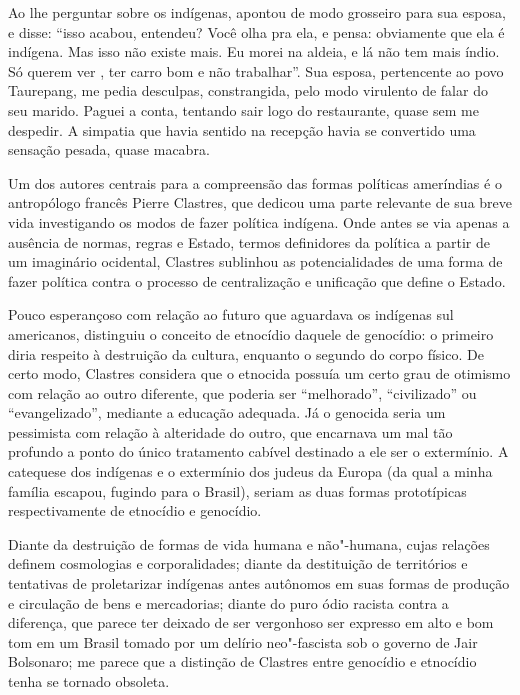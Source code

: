 Ao lhe perguntar sobre os indígenas, apontou de modo grosseiro para sua
esposa, e disse: ``isso acabou, entendeu? Você olha pra ela, e pensa:
obviamente que ela é indígena. Mas isso não existe mais. Eu morei na
aldeia, e lá não tem mais índio. Só querem ver , ter carro bom e não
trabalhar''. Sua esposa, pertencente ao povo Taurepang, me pedia
desculpas, constrangida, pelo modo virulento de falar do seu marido.
Paguei a conta, tentando sair logo do restaurante, quase sem me
despedir. A simpatia que havia sentido na recepção havia se convertido
uma sensação pesada, quase macabra.

\asterisc

Um dos autores centrais para a compreensão das formas políticas
ameríndias é o antropólogo francês Pierre Clastres, que dedicou uma
parte relevante de sua breve vida investigando os modos de fazer
política indígena. Onde antes se via apenas a ausência de normas, regras
e Estado, termos definidores da política a partir de um imaginário
ocidental, Clastres sublinhou as potencialidades de uma forma de fazer
política contra o processo de centralização e unificação que define o
Estado.

Pouco esperançoso com relação ao futuro que aguardava os indígenas sul
americanos, distinguiu o conceito de etnocídio daquele de genocídio: o
primeiro diria respeito à destruição da cultura, enquanto o segundo do
corpo físico. De certo modo, Clastres considera que o etnocida possuía
um certo grau de otimismo com relação ao outro diferente, que poderia
ser ``melhorado'', ``civilizado'' ou ``evangelizado'', mediante a
educação adequada. Já o genocida seria um pessimista com relação à
alteridade do outro, que encarnava um mal tão profundo a ponto do único
tratamento cabível destinado a ele ser o extermínio. A catequese dos
indígenas e o extermínio dos judeus da Europa (da qual a minha família
escapou, fugindo para o Brasil), seriam as duas formas prototípicas
respectivamente de etnocídio e genocídio.

Diante da destruição de formas de vida humana e não"-humana, cujas
relações definem cosmologias e corporalidades; diante da destituição de
territórios e tentativas de proletarizar indígenas antes autônomos em
suas formas de produção e circulação de bens e mercadorias; diante do
puro ódio racista contra a diferença, que parece ter deixado de ser
vergonhoso ser expresso em alto e bom tom em um Brasil tomado por um
delírio neo"-fascista sob o governo de Jair Bolsonaro; me parece que a
distinção de Clastres entre genocídio e etnocídio tenha se tornado
obsoleta.

